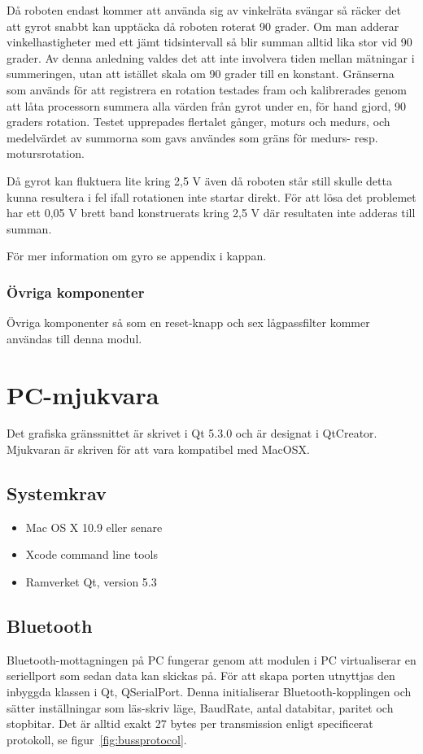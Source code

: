 \documentclass[a4paper,12pt,fleqn]{article}
\begin{document}
Då roboten endast kommer att använda sig av vinkelräta svängar så räcker det att gyrot snabbt kan upptäcka då roboten roterat 90 grader. Om man adderar vinkelhastigheter med ett jämt tidsintervall så blir summan alltid lika stor vid 90 grader. Av denna anledning valdes det att inte involvera tiden mellan mätningar i summeringen, utan att istället skala om 90 grader till en konstant.
Gränserna som används för att registrera en rotation testades fram och kalibrerades genom att låta processorn summera alla värden från gyrot under en, för hand gjord, 90 graders rotation. Testet upprepades flertalet gånger, moturs och medurs, och medelvärdet av summorna som gavs användes som gräns för medurs- resp. motursrotation.

Då gyrot kan fluktuera lite kring 2,5 V även då roboten står still skulle detta kunna resultera i fel ifall rotationen inte startar direkt. För att lösa det problemet har ett 0,05 V brett band konstruerats kring 2,5 V där resultaten inte adderas till summan. 

För mer information om gyro se appendix i kappan.

\subsubsection{Övriga komponenter}
Övriga komponenter så som en reset-knapp och sex lågpassfilter kommer användas till denna modul.



\newpage
\section{PC-mjukvara}
Det grafiska gränssnittet är skrivet i Qt 5.3.0 och är designat i QtCreator. Mjukvaran är skriven för att vara kompatibel med MacOSX.

\subsection{Systemkrav}
\begin{itemize}
	\item Mac OS X 10.9 eller senare
	\item Xcode command line tools
	\item Ramverket Qt, version 5.3
\end{itemize}

\subsection{Bluetooth}
Bluetooth-mottagningen på PC fungerar genom att modulen i PC virtualiserar en seriellport som sedan data kan skickas på. För att skapa porten utnyttjas den inbyggda klassen i Qt, QSerialPort. Denna initialiserar Bluetooth-kopplingen och sätter inställningar som läs-skriv läge, BaudRate, antal databitar, paritet och stopbitar. Det är alltid exakt 27 bytes per transmission enligt specificerat protokoll, se figur~\ref{fig:bussprotocol}. 
\end{document}
